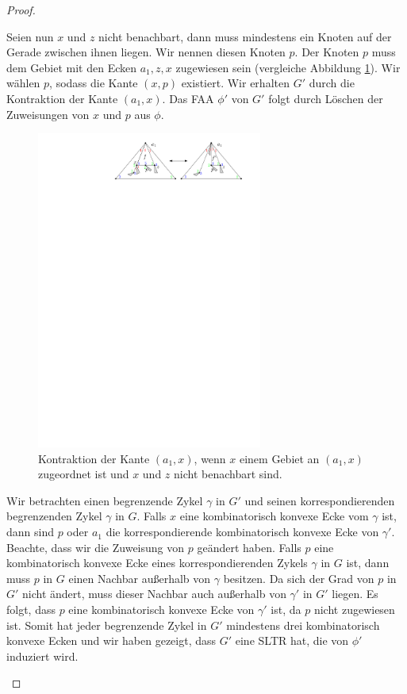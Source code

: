 \begin{proof}
\begin{description}[leftmargin =0pt, font = \rmfamily ,listparindent=\parindent,parsep=0pt]
\item[Fall 2:] Seien nun $x$ und $z$ nicht benachbart, dann muss mindestens ein Knoten auf der Gerade zwischen ihnen liegen. Wir nennen diesen Knoten $p$. Der Knoten $p$ muss dem Gebiet mit den Ecken $a_1,z,x$ zugewiesen sein (vergleiche Abbildung \ref{pic_lem5_10}). Wir wählen $p$, sodass die Kante $(x,p)$ existiert. Wir erhalten $G'$ durch die Kontraktion der Kante $(a_1,x)$. Das FAA $\phi'$ von $G'$ folgt durch Löschen der Zuweisungen von $x$ und $p$ aus $\phi$.

\begin{figure}[h]
\centering
\includegraphics[width=0.66\textwidth]{lem5_10.pdf}
\caption{Kontraktion der Kante $(a_1,x)$, wenn $x$ einem Gebiet an $(a_1,x)$ zugeordnet ist und $x$ und $z$ nicht benachbart sind.}
\label{pic_lem5_10}
\end{figure}

Wir betrachten einen begrenzende Zykel $\gamma$ in $G'$ und seinen korrespondierenden begrenzenden Zykel $\gamma$ in $G$. Falls $x$ eine kombinatorisch konvexe Ecke vom $\gamma$ ist, dann sind $p$ oder $a_1$ die korrespondierende kombinatorisch konvexe Ecke von $\gamma'$. Beachte, dass wir die Zuweisung von $p$ geändert haben. Falls $p$ eine kombinatorisch konvexe Ecke eines korrespondierenden Zykels $\gamma$ in $G$ ist, dann muss $p$ in $G$ einen Nachbar außerhalb von $\gamma$ besitzen. Da sich der Grad von $p$ in $G'$ nicht ändert, muss dieser Nachbar auch außerhalb von $\gamma'$ in $G'$ liegen. Es folgt, dass $p$ eine kombinatorisch konvexe Ecke von $\gamma'$ ist, da $p$ nicht zugewiesen ist. Somit hat jeder begrenzende Zykel in $G'$ mindestens drei kombinatorisch konvexe Ecken und wir haben gezeigt, dass $G'$ eine SLTR hat, die von $\phi'$ induziert wird.


\end{description}
\end{proof}
